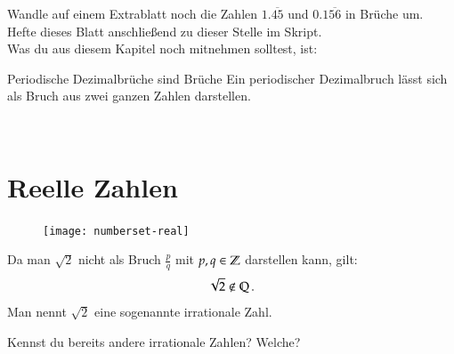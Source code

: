 Wandle auf einem Extrablatt noch die Zahlen $1.\overline{45}$ und $0.1\overline{56}$ in Brüche um.
Hefte dieses Blatt anschließend zu dieser Stelle im Skript.\\
Was du aus diesem Kapitel noch mitnehmen solltest, ist:

\begin{law}{Periodische Dezimalbrüche sind Brüche}
	\label{law:periodicIsRational}
	Ein periodischer Dezimalbruch lässt sich als Bruch aus zwei ganzen Zahlen darstellen.
\end{law}~

\section{Reelle Zahlen}
\begin{figure}
	\vspace{-1cm}
	\texttt{[image: numberset-real]}
	\vspace{-1cm}
\end{figure}
Da man $\sqrt{2}$ nicht als Bruch $\frac{p}{q}$ mit $p,q\in\mathbb{Z}$ darstellen kann, gilt:
\begin{align*}
  \sqrt{2} \notin \mathbb{Q}\, .
\end{align*}
Man nennt $\sqrt{2}$ eine sogenannte irrationale Zahl.
\begin{example}
 Kennst du bereits andere irrationale Zahlen? Welche?\\
\end{example}
